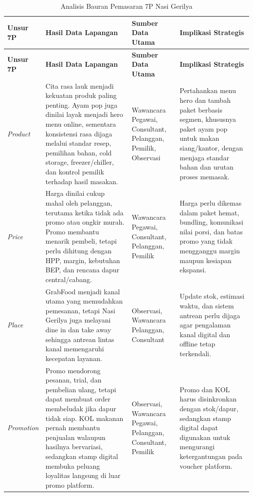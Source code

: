 \begingroup
    \scriptsize
    \begin{xltabular}{\textwidth}{|Z{1.45cm}|Y|L{2.85cm}|Y|}
        \caption{Analisis Bauran Pemasaran 7P Nasi Gerilya}
        \label{tab:analisis-7p-bab4}\\
        \toprule
        \textbf{Unsur 7P} & \textbf{Hasil Data Lapangan} & \textbf{Sumber Data Utama} & \textbf{Implikasi Strategis} \\ \hline
        \midrule
        \endfirsthead
        \toprule
        \textbf{Unsur 7P} & \textbf{Hasil Data Lapangan} & \textbf{Sumber Data Utama} & \textbf{Implikasi Strategis} \\ \hline
        \midrule
        \endhead
        \endfoot
        \bottomrule
        \endlastfoot
        \textit{Product} & Cita rasa lauk menjadi kekuatan produk paling penting. Ayam pop juga dinilai layak menjadi hero menu online, sementara konsistensi rasa dijaga melalui standar resep, pemilihan bahan, cold storage, freezer/chiller, dan kontrol pemilik terhadap hasil masakan. & Wawancara Pegawai, Consultant, Pelanggan, Pemilik, Observasi & Pertahankan menu hero dan tambah paket berbasis segmen, khususnya paket ayam pop untuk makan siang/kantor, dengan menjaga standar bahan dan urutan proses memasak. \\ \hline
        \textit{Price} & Harga dinilai cukup mahal oleh pelanggan, terutama ketika tidak ada promo atau ongkir murah. Promo membantu menarik pembeli, tetapi perlu dihitung dengan HPP, margin, kebutuhan BEP, dan rencana dapur central/cabang. & Wawancara Pegawai, Consultant, Pelanggan, Pemilik & Harga perlu dikemas dalam paket hemat, bundling, komunikasi nilai porsi, dan batas promo yang tidak mengganggu margin maupun kesiapan ekspansi. \\ \hline
        \textit{Place} & GrabFood menjadi kanal utama yang memudahkan pemesanan, tetapi Nasi Gerilya juga melayani dine in dan take away sehingga antrean lintas kanal memengaruhi kecepatan layanan. & Observasi, Wawancara Pelanggan, Consultant & Update stok, estimasi waktu, dan sistem antrean perlu dijaga agar pengalaman kanal digital dan offline tetap terkendali. \\ \hline
        \textit{Promotion} & Promo mendorong pesanan, trial, dan pembelian ulang, tetapi dapat membuat order membeludak jika dapur tidak siap. KOL makanan pernah membantu penjualan walaupun hasilnya bervariasi, sedangkan stamp digital membuka peluang loyalitas langsung di luar promo platform. & Observasi, Wawancara Pegawai, Pelanggan, Consultant, Pemilik & Promo dan KOL harus disinkronkan dengan stok/dapur, sedangkan stamp digital dapat digunakan untuk mengurangi ketergantungan pada voucher platform. \\ \hline

\end{xltabular}
